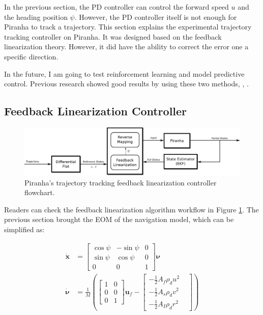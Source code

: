In the previous section, the PD controller can control the forward speed $u$ and the heading position $\psi$. However, the PD controller itself is not enough for Piranha to track a trajectory. This section explains the experimental trajectory tracking controller on Piranha. It was designed based on the feedback linearization theory. However, it did have the ability to correct the error one a specific direction.

In the future, I am going to test reinforcement learning and model predictive control. Previous research showed good results by using these two methods\cite{woo2018dynamic}, \cite{cuiarticle}, \cite{naeemarticle}.


\subsection{Feedback Linearization Controller}

\begin{figure}[H]
    \centering
    \includegraphics[width=.8\textwidth]{images/05fl-flowchart.pdf}
    \caption{Piranha's trajectory tracking feedback linearization controller flowchart.}
    \label{fig:05fl-flowchart}
\end{figure}

Readers can check the feedback linearization algorithm workflow in Figure \ref{fig:05fl-flowchart}. The previous section brought the EOM of the navigation model, which can be simplified as:

\begin{align}
    \dot{\boldsymbol{x}} & =\left[\begin{array}{ccc}
        \cos{\psi} & -\sin{\psi} & 0  \\
        \sin{\psi} & \cos{\psi} & 0 \\
        0 & 0 & 1
    \end{array}\right]\boldsymbol{\nu} \\
    \dot{\boldsymbol{\nu}} & =\frac{1}{M}\left(\left[\begin{array}{cc}
        1 & 0 \\
        0 & 0\\
        0 & 1 
    \end{array}\right]\boldsymbol{u}_f-\left[\begin{aligned}
        -\frac{1}{2}A_f \rho_d u^2 & \\
        -\frac{1}{2}A_s \rho_d v^2 & \\
        -\frac{1}{2}A_I \rho_d r^2 &
    \end{aligned}\right]\right)
\end{align}

